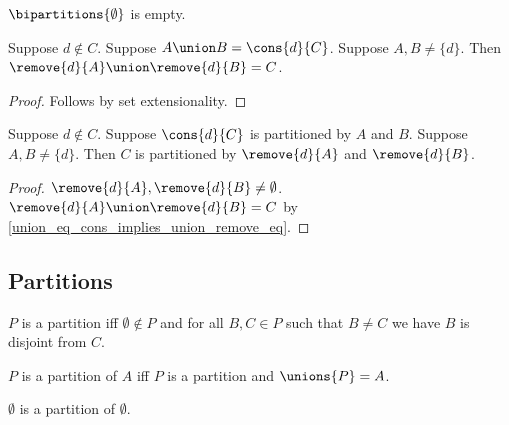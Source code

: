 \begin{proposition}\label{bipartitions_emptyset}
    $\bipartitions{\emptyset}$ is empty.
\end{proposition}

\begin{proposition}\label{union_eq_cons_implies_union_remove_eq}
    Suppose $d\notin C$.
    Suppose $A\union B = \cons{d}{C}$.
    Suppose $A, B\neq \{d\}$.
    Then $\remove{d}{A}\union \remove{d}{B} = C$.
\end{proposition}
\begin{proof}
    Follows by set extensionality.
\end{proof}

\begin{proposition}\label{bipartitions_cons}
    Suppose $d\notin C$.
    Suppose $\cons{d}{C}$ is partitioned by $A$ and $B$.
    Suppose $A, B\neq \{d\}$.
    Then $C$ is partitioned by $\remove{d}{A}$ and $\remove{d}{B}$.
\end{proposition}
\begin{proof}
    $\remove{d}{A},\remove{d}{B}\neq\emptyset$.
    $\remove{d}{A}\union \remove{d}{B} = C$ by \cref{union_eq_cons_implies_union_remove_eq}.
\end{proof}

\subsection{Partitions}

\begin{definition}\label{partition}
    $P$ is a partition iff
    $\emptyset\notin P$ and
    for all $B, C\in P$ such that $B\neq C$ we have $B$ is disjoint from $C$.
\end{definition}

\begin{abbreviation}\label{partition_of}
    $P$ is a partition of $A$ iff
    $P$ is a partition and
    $\unions{P} = A$.
\end{abbreviation}

\begin{proposition}\label{partition_emptyset}
    $\emptyset$ is a partition of $\emptyset$.
\end{proposition}

